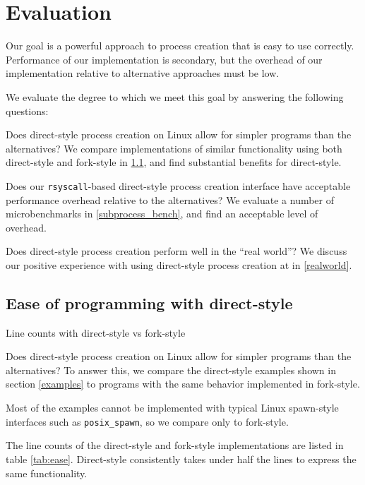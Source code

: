 \documentclass[letterpaper,twocolumn,10pt]{article}
\begin{document}
\section{Evaluation}\label{evaluation}
Our goal is a powerful approach to process creation that is easy to use correctly.
Performance of our implementation is secondary,
but the overhead of our implementation relative to alternative approaches
must be low.

We evaluate the degree to which we meet this goal by answering the following questions:
\begin{compactitem}
\item
  Does direct-style process creation on Linux allow for simpler programs than the alternatives?
  We compare implementations of similar functionality using both direct-style and fork-style in \ref{ease},
  and find substantial benefits for direct-style.
\item
  Does our \texttt{rsyscall}-based direct-style process creation interface
  have acceptable performance overhead relative to the alternatives?
  We evaluate a number of microbenchmarks in \ref{subprocess_bench},
  and find an acceptable level of overhead.
\item
  Does direct-style process creation perform well in the ``real world''?
  We discuss our positive experience with using direct-style process creation at \twosigma{} in \ref{realworld}.
\end{compactitem}
\subsection{Ease of programming with direct-style}\label{ease}
\begin{table}

\caption{Line counts with direct-style vs fork-style}
\label{tab:ease}
\end{table}
Does direct-style process creation on Linux allow for simpler programs than the alternatives?
To answer this, we compare the direct-style examples shown in section \ref{examples}
to programs with the same behavior implemented in fork-style.

Most of the examples cannot be implemented with typical Linux spawn-style interfaces such as \verb|posix_spawn|,
so we compare only to fork-style.

The line counts of the direct-style and fork-style implementations are listed in table \ref{tab:ease}.
Direct-style consistently takes under half the lines to express the same functionality.
\end{document}
